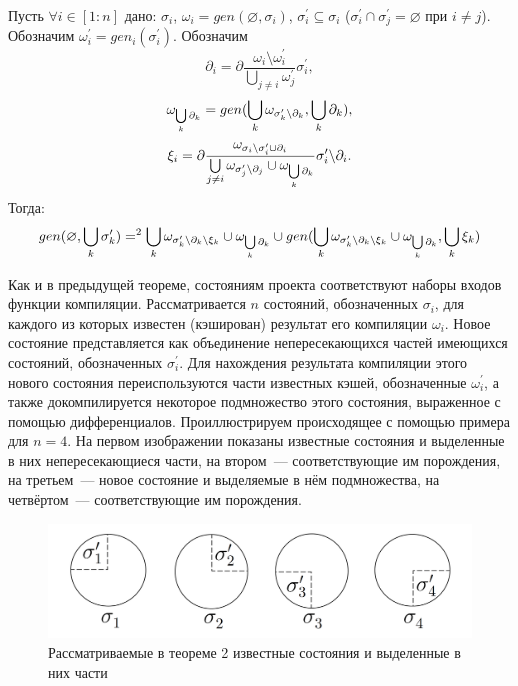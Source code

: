 Пусть $\forall i \in [1:n]$ дано: $\sigma_i$, $\omega_i = gen(\varnothing, \sigma_i)$, $\sigma_i^\prime \subseteq \sigma_i$ ($\sigma_i^\prime \cap \sigma_j^\prime = \varnothing$ при $i \neq j$). Обозначим $\omega_i^\prime = gen_i(\sigma_i^\prime)$. Обозначим 
$$\partial_i = \partial\dfrac{\omega_i \setminus \omega_i^\prime}{\bigcup\limits_{j \neq i} \omega_j^\prime} \sigma_i^\prime,$$
$$\omega_{\bigcup\limits_k {\partial_k}} = gen(\bigcup\limits_k \omega_{{\sigma^\prime_k}{\setminus}{\partial_k}}, \bigcup\limits_k {\partial_k}),$$
$$\xi_i = \partial\dfrac{\omega_{{\sigma_i}{\setminus}{\sigma^\prime_i} \cup {\partial_i}}}{\bigcup\limits_{j \neq i} \omega_{{\sigma^\prime_j}{\setminus}{\partial_j}} \cup \omega_{\bigcup\limits_k \partial_k}} {\sigma^\prime_i}{\setminus}{\partial_i}.$$
Тогда:
$$gen(\varnothing, \bigcup\limits_k {\sigma^\prime_k}) =^2 \bigcup\limits_k \omega_{{\sigma^\prime_k}{\setminus}{\partial_k}{\setminus}{\xi_k}} \cup \omega_{\bigcup\limits_k \partial_k} \cup gen(\bigcup\limits_k \omega_{{\sigma^\prime_k}{\setminus}{\partial_k}{\setminus}{\xi_k}} \cup \omega_{\bigcup\limits_k \partial_k}, \bigcup\limits_k {\xi_k})$$

Как и в предыдущей теореме, состояниям проекта соответствуют наборы входов функции компиляции. Рассматривается $n$ состояний, обозначенных $\sigma_i$, для каждого из которых известен (кэширован) результат его компиляции $\omega_i$. Новое состояние представляется как объединение непересекающихся частей имеющихся состояний, обозначенных $\sigma^\prime_i$. Для нахождения результата компиляции этого нового состояния переиспользуются части известных кэшей, обозначенные $\omega^\prime_i$, а также докомпилируется некоторое подмножество этого состояния, выраженное с помощью дифференциалов. Проиллюстрируем происходящее с помощью примера для $n = 4$. На первом изображении показаны известные состояния и выделенные в них непересекающиеся части, на втором~--- соответствующие им порождения, на третьем~--- новое состояние и выделяемые в нём подмножества, на четвёртом~--- соответствующие им порождения.

\begin{figure}[h]
	\centering
	\includegraphics[width=160mm]{theorem2_src.png}
	\caption{Рассматриваемые в теореме 2 известные состояния и выделенные в них части}
	\label{fig:theorem2_src}
\end{figure}

